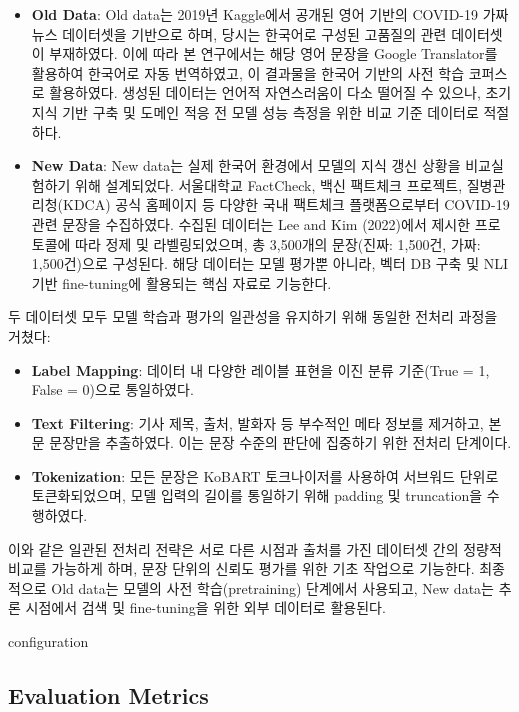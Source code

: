 \documentclass[a4paper,fleqn]{cas-sc}
\begin{document}
\begin{itemize}
    \item{\textbf{Old Data}:
    Old data는 2019년 Kaggle에서 공개된 영어 기반의 COVID-19 가짜 뉴스 데이터셋을 기반으로 하며, 당시는 한국어로 구성된 고품질의 관련 데이터셋이 부재하였다.  
    이에 따라 본 연구에서는 해당 영어 문장을 Google Translator를 활용하여 한국어로 자동 번역하였고, 이 결과물을 한국어 기반의 사전 학습 코퍼스로 활용하였다.  
    생성된 데이터는 언어적 자연스러움이 다소 떨어질 수 있으나, 초기 지식 기반 구축 및 도메인 적응 전 모델 성능 측정을 위한 비교 기준 데이터로 적절하다.}
    \item{\textbf{New Data}:
    New data는 실제 한국어 환경에서 모델의 지식 갱신 상황을 비교실험하기 위해 설계되었다.  
    서울대학교 FactCheck, 백신 팩트체크 프로젝트, 질병관리청(KDCA) 공식 홈페이지 등 다양한 국내 팩트체크 플랫폼으로부터 COVID-19 관련 문장을 수집하였다.  
    수집된 데이터는 Lee and Kim (2022)에서 제시한 프로토콜에 따라 정제 및 라벨링되었으며, 총 3,500개의 문장(진짜: 1,500건, 가짜: 1,500건)으로 구성된다.  
    해당 데이터는 모델 평가뿐 아니라, 벡터 DB 구축 및 NLI 기반 fine-tuning에 활용되는 핵심 자료로 기능한다.}
    
\end{itemize}  
두 데이터셋 모두 모델 학습과 평가의 일관성을 유지하기 위해 동일한 전처리 과정을 거쳤다:

\begin{itemize}
    \item{\textbf{Label Mapping}:
    데이터 내 다양한 레이블 표현을 이진 분류 기준(True = 1, False = 0)으로 통일하였다.}
    \item{\textbf{Text Filtering}:
    기사 제목, 출처, 발화자 등 부수적인 메타 정보를 제거하고, 본문 문장만을 추출하였다.  
    이는 문장 수준의 판단에 집중하기 위한 전처리 단계이다.}
    \item{\textbf{Tokenization}: 
    모든 문장은 KoBART 토크나이저를 사용하여 서브워드 단위로 토큰화되었으며, 모델 입력의 길이를 통일하기 위해 padding 및 truncation을 수행하였다.
    }
\end{itemize}  

이와 같은 일관된 전처리 전략은 서로 다른 시점과 출처를 가진 데이터셋 간의 정량적 비교를 가능하게 하며, 문장 단위의 신뢰도 평가를 위한 기초 작업으로 기능한다.  
최종적으로 Old data는 모델의 사전 학습(pretraining) 단계에서 사용되고, New data는 추론 시점에서 검색 및 fine-tuning을 위한 외부 데이터로 활용된다.

configuration

\subsection{Evaluation Metrics}
\end{document}
